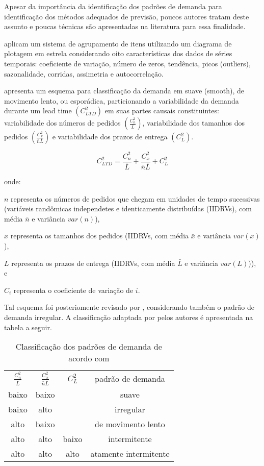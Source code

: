 \documentclass{book}
\begin{document}
Apesar da importância da identificação dos padrões de demanda para identificação dos métodos adequados de previsão, poucos autores tratam deste assunto e poucas técnicas são apresentadas na literatura para essa finalidade.

\cite{BusingerRead1999} aplicam um sistema de agrupamento de itens utilizando um diagrama de plotagem em estrela considerando oito características dos dados de séries temporais: coeficiente de variação, número de zeros, tendência, picos (outliers), sazonalidade, corridas, assimetria e autocorrelação.

\cite{Williams1984} apresenta um esquema para classificação da demanda em suave (smooth), de movimento lento, ou esporádica, particionando a variabilidade da demanda durante um lead time $(C_{LTD}^{2})$ em suas partes causais constituintes: variabilidade dos números de pedidos $(\frac{C_{n}^{2}}{\bar{L}})$, variabilidade dos tamanhos dos pedidos $(\frac{C_{x}^{2}}{\bar{n}\bar{L}})$ e variabilidade dos prazos de entrega $(C_{L}^{2})$. 

\begin{equation}
C_{LTD}^{2} = \frac{C_{n}^{2}}{\bar{L}} + \frac{C_{x}^{2}}{\bar{n}\bar{L}} + C_{L}^{2}
\end{equation}

onde:

$n$ representa os números de pedidos que chegam em unidades de tempo sucessivas (variáveis randômicas independetes e identicamente distribuídas (IIDRVs), com média $\bar{n}$ e variância $var(n)$), 

$x$ representa os tamanhos dos pedidos (IIDRVs, com média $\bar{x}$ e variância $var(x)$),  

$L$ representa os prazos de entrega (IIDRVs, com média $\bar{L}$ e variância $var(L)$)), e 

$C_{i}$ representa o coeficiente de variação de $i$. 

Tal esquema foi posteriomente revisado por \cite{EavesKingsman2004}, considerando também o padrão de demanda irregular. A classificação adaptada por pelos autores é apresentada na tabela a seguir.

\begin{table}[h]
\begin{center}
\begin{tabular}[c]{c c c c}
\cline {1-4}
$\frac{C_{n}^{2}}{\bar{L}}$ & $\frac{C_{x}^{2}}{\bar{n}\bar{L}}$ & $C_{L}^{2}$ & padrão de demanda \\ \cline {1-4}
baixo & baixo &  & suave   \\ 
baixo & alto  &  & irregular   \\ 
alto  & baixo &  & de movimento lento   \\
alto  & alto  & baixo & intermitente   \\
alto  & alto  & alto  & atamente intermitente\\ \cline {1-4}
\end{tabular}
\caption{Classificação dos padrões de demanda de acordo com \cite{EavesKingsman2004}}
\label{tab:DemandPattern}
\end{center}
\end{table}
\end{document}
